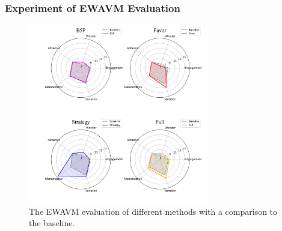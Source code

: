 \subsubsection{Experiment of EWAVM Evaluation } \label{sec:FullGameStudy_LLM}


\begin{table}[ht]
  \renewcommand{\arraystretch}{1.3}
  \setlength{\tabcolsep}{10pt}
      \centering
  \caption{The result of EWAVM evaluation of different methods. The highest score of each factor is underlined.
  }
  \label{tab:FullGameStudy_LLM_Data}
\end{table}


\begin{figure}[ht]
  \centering
  \includegraphics[width=0.7\textwidth]{img/EWAVM_radar.jpg}
  \caption{The EWAVM evaluation of different methods with a comparison to the baseline. }
\label{fig:FullGameStudy_EWAVM_radar}
    \vspace{-1em}
\end{figure}

